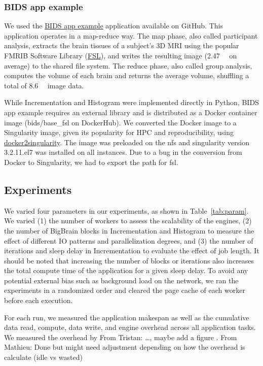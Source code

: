\documentclass[conference]{IEEEtran}
\newcommand{\TG}[1]{\color{cyan}From Tristan: #1 \color{black}}
\newcommand{\MD}[1]{\color{magenta}From Mathieu: #1 \color{black}}
\begin{document}
\subsubsection{BIDS app example}

We used the \href{https://github.com/BIDS-Apps/example}{BIDS app example} application
available on GitHub. This application operates in a map-reduce way. The map phase,
also called participant analysis, extracts the brain tissues of a subject's 3D MRI
using the popular FMRIB Software Library
(\href{https://fsl.fmrib.ox.ac.uk/fsl/fslwiki}{FSL}), and writes the resulting image
(\SI{2.47}{\mega\byte} on average) to the shared file system. The reduce phase, also
called group analysis, computes the volume of each brain and returns the average
volume, shuffling a total of \SI{8.6}{\giga\byte} image data.

While Incrementation and Histogram were implemented directly in Python, BIDS app
example requires an external library and is distributed as a Docker container image
(bids/base\_fsl on DockerHub). We converted the Docker image to a Singularity image,
given its popularity for HPC and reproducibility, using
\href{https://hub.docker.com/r/singularityware/docker2singularity/tags/}{docker2singularity}.
The image was preloaded on the nfs and singularity version 3.2.1\-1.el7 was installed
on all instances. Due to a bug in the conversion from Docker to Singularity, we had to
export the path for fsl.

\subsection{Experiments}

We varied four parameters in our experiments, as shown in
Table~\ref{tab:param}. We varied (1) the number of workers to assess the
scalability of the engines, (2) the number of BigBrain blocks in
Incrementation and Histogram to measure the effect of different IO patterns
and parallelization degrees, and (3) the number of iterations and sleep
delay in Incrementation to evaluate the effect of job length.
It should be noted that increasing the number of blocks or iterations also
increases the total compute time of the application for a given sleep
delay. To avoid any potential external bias such as background load on the
network, we ran the experiments in a randomized order and cleared the page
cache of each worker before each execution.

For each run, we measured the application makespan as well as the cumulative 
data read, compute, data write, and engine overhead across all application tasks. 
We measured the overhead by \TG{\ldots, maybe add a figure}. \MD{Done but might need
adjustment depending on how the overhead is calculate (idle vs wasted)}
\end{document}
